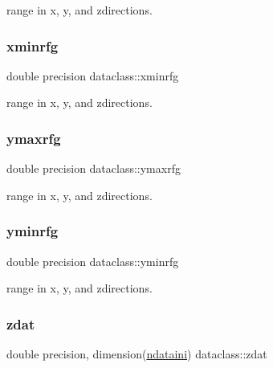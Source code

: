 range in x, y, and zdirections. 

\mbox{\label{namespacedataclass_ab5b5b652fce1e93de12accd3514958a0}} 
\subsubsection{\texorpdfstring{xminrfg}{xminrfg}}
{\footnotesize\ttfamily double precision dataclass\+::xminrfg}



range in x, y, and zdirections. 

\mbox{\label{namespacedataclass_a79212aa125148748cc4bd5a11fff492f}} 
\subsubsection{\texorpdfstring{ymaxrfg}{ymaxrfg}}
{\footnotesize\ttfamily double precision dataclass\+::ymaxrfg}



range in x, y, and zdirections. 

\mbox{\label{namespacedataclass_a5393ad3032e6f0311c62d03d468a6cf0}} 
\subsubsection{\texorpdfstring{yminrfg}{yminrfg}}
{\footnotesize\ttfamily double precision dataclass\+::yminrfg}



range in x, y, and zdirections. 

\mbox{\label{namespacedataclass_aeed47a37719b1f84d885a1cb8a962081}} 
\subsubsection{\texorpdfstring{zdat}{zdat}}
{\footnotesize\ttfamily double precision, dimension(\mbox{\hyperlink{namespacedataclass_a2578bbe9c4dc0892ee08a8619cd7e978}{ndataini}}) dataclass\+::zdat}



